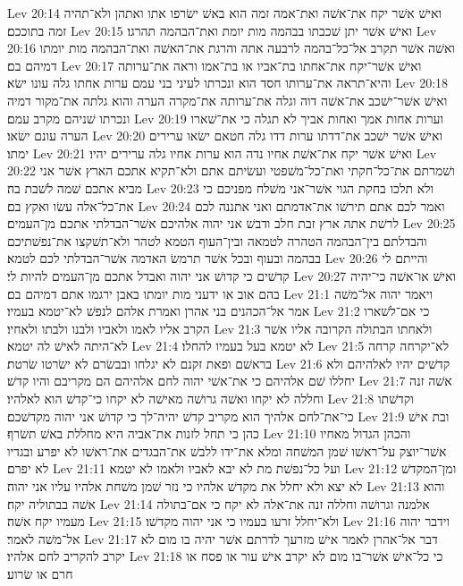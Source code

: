 Lev 20:14  ואישׁ אשׁר יקח את־אשׁה ואת־אמה זמה הוא באשׁ ישׂרפו אתו ואתהן ולא־תהיה זמה בתוככם׃
Lev 20:15  ואישׁ אשׁר יתן שׁכבתו בבהמה מות יומת ואת־הבהמה תהרגו׃
Lev 20:16  ואשׁה אשׁר תקרב אל־כל־בהמה לרבעה אתה והרגת את־האשׁה ואת־הבהמה מות יומתו דמיהם בם׃
Lev 20:17  ואישׁ אשׁר־יקח את־אחתו בת־אביו או בת־אמו וראה את־ערותה והיא־תראה את־ערותו חסד הוא ונכרתו לעיני בני עמם ערות אחתו גלה עונו ישׂא׃
Lev 20:18  ואישׁ אשׁר־ישׁכב את־אשׁה דוה וגלה את־ערותה את־מקרה הערה והוא גלתה את־מקור דמיה ונכרתו שׁניהם מקרב עמם׃
Lev 20:19  וערות אחות אמך ואחות אביך לא תגלה כי את־שׁארו הערה עונם ישׂאו׃
Lev 20:20  ואישׁ אשׁר ישׁכב את־דדתו ערות דדו גלה חטאם ישׂאו ערירים ימתו׃
Lev 20:21  ואישׁ אשׁר יקח את־אשׁת אחיו נדה הוא ערות אחיו גלה ערירים יהיו׃
Lev 20:22  ושׁמרתם את־כל־חקתי ואת־כל־משׁפטי ועשׂיתם אתם ולא־תקיא אתכם הארץ אשׁר אני מביא אתכם שׁמה לשׁבת בה׃
Lev 20:23  ולא תלכו בחקת הגוי אשׁר־אני משׁלח מפניכם כי את־כל־אלה עשׂו ואקץ בם׃
Lev 20:24  ואמר לכם אתם תירשׁו את־אדמתם ואני אתננה לכם לרשׁת אתה ארץ זבת חלב ודבשׁ אני יהוה אלהיכם אשׁר־הבדלתי אתכם מן־העמים׃
Lev 20:25  והבדלתם בין־הבהמה הטהרה לטמאה ובין־העוף הטמא לטהר ולא־תשׁקצו את־נפשׁתיכם בבהמה ובעוף ובכל אשׁר תרמשׂ האדמה אשׁר־הבדלתי לכם לטמא׃
Lev 20:26  והייתם לי קדשׁים כי קדושׁ אני יהוה ואבדל אתכם מן־העמים להיות לי׃
Lev 20:27  ואישׁ או־אשׁה כי־יהיה בהם אוב או ידעני מות יומתו באבן ירגמו אתם דמיהם בם׃
Lev 21:1  ויאמר יהוה אל־משׁה אמר אל־הכהנים בני אהרן ואמרת אלהם לנפשׁ לא־יטמא בעמיו׃
Lev 21:2  כי אם־לשׁארו הקרב אליו לאמו ולאביו ולבנו ולבתו ולאחיו׃
Lev 21:3  ולאחתו הבתולה הקרובה אליו אשׁר לא־היתה לאישׁ לה יטמא׃
Lev 21:4  לא יטמא בעל בעמיו להחלו׃
Lev 21:5  לא־יקרחה קרחה בראשׁם ופאת זקנם לא יגלחו ובבשׂרם לא ישׂרטו שׂרטת׃
Lev 21:6  קדשׁים יהיו לאלהיהם ולא יחללו שׁם אלהיהם כי את־אשׁי יהוה לחם אלהיהם הם מקריבם והיו קדשׁ׃
Lev 21:7  אשׁה זנה וחללה לא יקחו ואשׁה גרושׁה מאישׁה לא יקחו כי־קדשׁ הוא לאלהיו׃
Lev 21:8  וקדשׁתו כי־את־לחם אלהיך הוא מקריב קדשׁ יהיה־לך כי קדושׁ אני יהוה מקדשׁכם׃
Lev 21:9  ובת אישׁ כהן כי תחל לזנות את־אביה היא מחללת באשׁ תשׂרף׃
Lev 21:10  והכהן הגדול מאחיו אשׁר־יוצק על־ראשׁו שׁמן המשׁחה ומלא את־ידו ללבשׁ את־הבגדים את־ראשׁו לא יפרע ובגדיו לא יפרם׃
Lev 21:11  ועל כל־נפשׁת מת לא יבא לאביו ולאמו לא יטמא׃
Lev 21:12  ומן־המקדשׁ לא יצא ולא יחלל את מקדשׁ אלהיו כי נזר שׁמן משׁחת אלהיו עליו אני יהוה׃
Lev 21:13  והוא אשׁה בבתוליה יקח׃
Lev 21:14  אלמנה וגרושׁה וחללה זנה את־אלה לא יקח כי אם־בתולה מעמיו יקח אשׁה׃
Lev 21:15  ולא־יחלל זרעו בעמיו כי אני יהוה מקדשׁו׃
Lev 21:16  וידבר יהוה אל־משׁה לאמר׃
Lev 21:17  דבר אל־אהרן לאמר אישׁ מזרעך לדרתם אשׁר יהיה בו מום לא יקרב להקריב לחם אלהיו׃
Lev 21:18  כי כל־אישׁ אשׁר־בו מום לא יקרב אישׁ עור או פסח או חרם או שׂרוע׃
